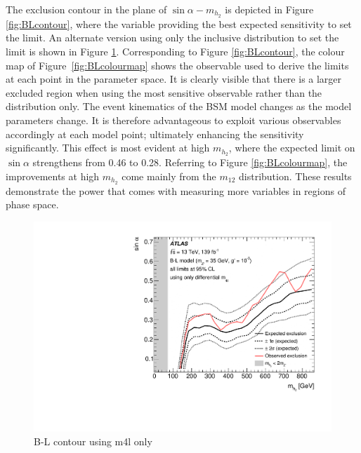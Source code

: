 The exclusion contour in the plane of $\sin\alpha-m_{h_2}$ is depicted in Figure \ref{fig:BLcontour}, where the variable providing the best expected sensitivity to set the limit. An alternate version using only the inclusive \mFourL distribution to set the limit is shown in Figure \ref{fig:BLcontourm4l}. Corresponding to Figure \ref{fig:BLcontour}, the colour map of Figure~\ref{fig:BLcolourmap} shows the observable used to derive the limits at each point in the parameter space. It is clearly visible that there is a larger excluded region when using the most sensitive observable rather than the \mFourL distribution only. The event kinematics of the BSM model changes as the model parameters change. It is therefore advantageous to exploit various observables accordingly at each model point; ultimately enhancing the sensitivity significantly. This effect is most evident at high $m_{h_2}$, where the expected limit on $\sin\alpha$ strengthens from 0.46 to 0.28. Referring to Figure \ref{fig:BLcolourmap}, the improvements at high $m_{h_2}$ come mainly from the $m_{12}$ distribution. These results demonstrate the power that comes with measuring more variables in regions of phase space. 
\begin{figure}
    \centering
    \includegraphics[width=\mediumfigwidth]{Figures/m4l/Interpretations/UpperLimitBandWithContour_2D_withTheoExcl_m4l.pdf}
    \caption{B-L contour using m4l only}
    \label{fig:BLcontourm4l}
\end{figure}

